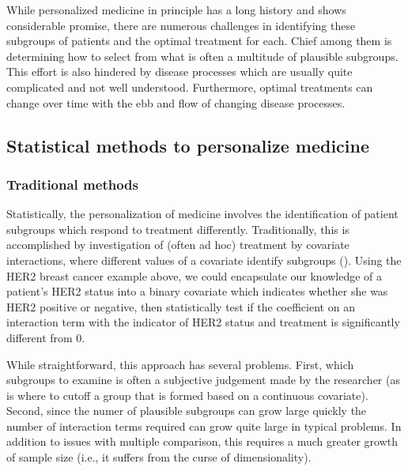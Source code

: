 \documentclass[12pt]{article}
\begin{document}
While personalized medicine in principle has a long history and shows considerable promise, there are numerous challenges in identifying these subgroups of patients and the optimal treatment for each. Chief among them is determining how to select from what is often a multitude of plausible subgroups. This effort is also hindered by disease processes which are usually quite complicated and not well understood. Furthermore, optimal treatments can change over time with the ebb and flow of changing disease processes.


\subsection{Statistical methods to personalize medicine} %
\label{sub:statistical_methods_to_personalize_medicine}


\subsubsection{Traditional methods} %
\label{ssub:traditional_methods}


Statistically, the personalization of medicine involves the identification of patient subgroups which respond to treatment differently. Traditionally, this is accomplished by investigation of (often ad hoc) treatment by covariate interactions, where different values of a covariate identify subgroups (\cite{Byar1985}). Using the HER2 breast cancer example above, we could encapsulate our knowledge of a patient's HER2 status into a binary covariate which indicates whether she was HER2 positive or negative, then statistically test if the coefficient on an interaction term with the indicator of HER2 status and treatment is significantly different from 0.


While straightforward, this approach has several problems. First, which subgroups to examine is often a subjective judgement made by the researcher (as is where to cutoff a group that is formed based on a continuous covariate). Second, since the numer of plausible subgroups can grow large quickly the number of interaction terms required can grow quite large in typical problems. In addition to issues with multiple comparison, this requires a much greater growth of sample size (i.e., it suffers from the curse of dimensionality).
\end{document}
